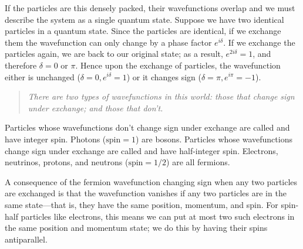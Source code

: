 If the particles are this densely packed, their wavefunctions overlap and we must describe the system as a single quantum state.
Suppose we have two identical particles in a quantum state. Since the particles are identical, if we exchange them the wavefunction can only change by a phase factor $e^{i\delta}$. If we exchange the particles again, we are back to our original state; as a result, $e^{2i\delta} = 1$, and therefore $\delta = 0$ or $\pi$. Hence upon the exchange of particles, the wavefunction either is unchanged ($\delta=0,e^{i\delta}=1$) or it changes sign ($\delta=\pi,e^{i\pi}=-1$).
\begin{quote}\itshape
    There are two types of wavefunctions in this world: those that change sign under exchange; and those that don't.
\end{quote}
Particles whose wavefunctions don't change sign under exchange are called  and have integer spin. Photons ($\textrm{spin} = 1$) are bosons. Particles whose wavefunctions change sign under exchange are called  and have half-integer spin. Electrons, neutrinos, protons, and neutrons ($\textrm{spin} = 1/2$) are all fermions. 

A consequence of the fermion wavefunction changing sign when any two particles are exchanged is that the wavefunction vanishes if any two particles are in the same state---that is, they have the same position, momentum, and spin. For spin-half particles like electrons, this means we can put at most two such electrons in the same position and momentum state; we do this by having their spins antiparallel.

